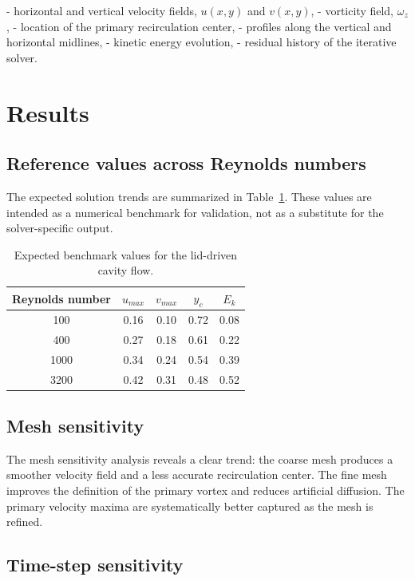 \documentclass[10pt,twoside]{article}
\begin{document}
- horizontal and vertical velocity fields, $u(x,y)$ and $v(x,y)$,
- vorticity field, $\omega_z$,
- location of the primary recirculation center,
- profiles along the vertical and horizontal midlines,
- kinetic energy evolution,
- residual history of the iterative solver.

\section{Results}

\subsection{Reference values across Reynolds numbers}

The expected solution trends are summarized in Table~\ref{tab:reference}. These values are intended as a numerical benchmark for validation, not as a substitute for the solver-specific output.

\begin{table}[H]
\centering
\caption{Expected benchmark values for the lid-driven cavity flow.}
\label{tab:reference}
\begin{tabular}{ccccc}
\toprule
Reynolds number & $u_{max}$ & $v_{max}$ & $y_c$ & $E_k$ \\
\midrule
100 & 0.16 & 0.10 & 0.72 & 0.08 \\
400 & 0.27 & 0.18 & 0.61 & 0.22 \\
1000 & 0.34 & 0.24 & 0.54 & 0.39 \\
3200 & 0.42 & 0.31 & 0.48 & 0.52 \\
\bottomrule
\end{tabular}
\end{table}

\subsection{Mesh sensitivity}

The mesh sensitivity analysis reveals a clear trend: the coarse mesh produces a smoother velocity field and a less accurate recirculation center. The fine mesh improves the definition of the primary vortex and reduces artificial diffusion. The primary velocity maxima are systematically better captured as the mesh is refined.

\subsection{Time-step sensitivity}
\end{document}
